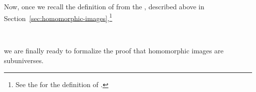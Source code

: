\documentclass[a4paper,USenglish,cleveref,autoref,thm-restate]{lipics-v2019}
\begin{document}
Now, once we recall the definition of  from the \homsmodule, described above in Section~\ref{sec:homomorphic-images},\footnote{See the \preludemodule for the definition of \AgdaSpace{}.}
\begin{code}
\>[0]\AgdaSpace{}%
\AgdaSymbol{:}\AgdaSpace{}%
\AgdaSymbol{\{}\AgdaSpace{}%
\AgdaSymbol{:}\AgdaSpace{}%
\AgdaSpace{}%
\AgdaSpace{}%
\AgdaSymbol{\}(}\AgdaSpace{}%
\AgdaSymbol{:}\AgdaSpace{}%
\AgdaSpace{}%
\AgdaSpace{}%
\AgdaSymbol{)(}\AgdaSpace{}%
\AgdaSymbol{:}\AgdaSpace{}%
\AgdaSpace{}%
\AgdaSpace{}%
\AgdaSymbol{)}\AgdaSpace{}%
\AgdaSpace{}%
\AgdaSpace{}%
\AgdaSpace{}%
\AgdaSpace{}%
\AgdaSpace{}%
\AgdaSpace{}%
\<%
\\
\>[0]\AgdaSpace{}%
\AgdaSpace{}%
\AgdaSpace{}%
\AgdaSymbol{=}\AgdaSpace{}%
\AgdaSpace{}%
\AgdaSpace{}%
\AgdaSpace{}%
\AgdaSpace{}%
\AgdaSpace{}%
\AgdaSpace{}%
\AgdaSpace{}%
\AgdaSpace{}%
\<%
\end{code}
we are finally ready to formalize the proof that homomorphic images are subuniverses.
\begin{code}\end{code}
\end{document}
